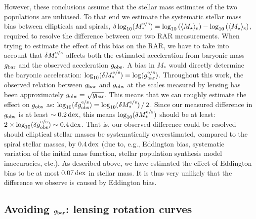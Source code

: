 \documentclass[usenatbib]{mnras}
\newcommand{\un}[1]{_{\rm #1}}
\newcommand{\dex}{\, {\rm dex}}
\begin{document}
However, these conclusions assume that the stellar mass estimates of the two populations are unbiased. To that end we estimate the systematic stellar mass bias between ellipticals and spirals, $\delta \log_{10}(M^{\rm e/s}_*) = \log_{10}\left(\langle M_\star\rangle_{\rm e}\right) - \log_{10}\left(\langle M_\star\rangle_{\rm s}\right)$, required to resolve the difference between our two RAR measurements. When trying to estimate the effect of this bias on the RAR, we have to take into account that $\delta M^{\rm e/s}_*$ affects both the estimated acceleration from baryonic mass $g\un{bar}$ and the observed acceleration $g\un{obs}$. A bias in $M_*$ would directly determine the baryonic acceleration: $\log_{10}(\delta M^{\rm e/s}_*) = \log(g^{\rm e/s}\un{bar})$. Throughout this work, the observed relation between $g\un{bar}$ and $g\un{obs}$ at the scales measured by lensing has been approximately $g\un{obs} = \sqrt{g\un{bar}}$. This means that we can roughly estimate the effect on $g\un{obs}$ as: $\log_{10}(\delta g^{\rm e/s}\un{obs}) = {\log_{10}(\delta M^{\rm e/s}_*)} \, / \, {2}$. Since our measured difference in $g\un{obs}$ is at least $\sim0.2 \dex$, this means ${\log_{10}(\delta M^{\rm e/s}_*)}$ should be at least: $2 \times \log_{10}(\delta g^{\rm e/s}\un{obs}) \sim 0.4 \dex$. That is, our observed difference could be resolved should elliptical stellar masses be systematically overestimated, compared to the spiral stellar masses, by $0.4 \dex$ (due to, e.g., Eddington bias, systematic variation of the initial mass function, stellar population synthesis model inaccuracies, etc.). As described above, we have estimated the effect of Eddington bias to be at most $0.07 \dex$ in stellar mass. It is thus very unlikely that the difference we observe is caused by Eddington bias.

\subsection{Avoiding $g\un{bar}$: lensing rotation curves}
\label{sec:results-rotation}
\end{document}
